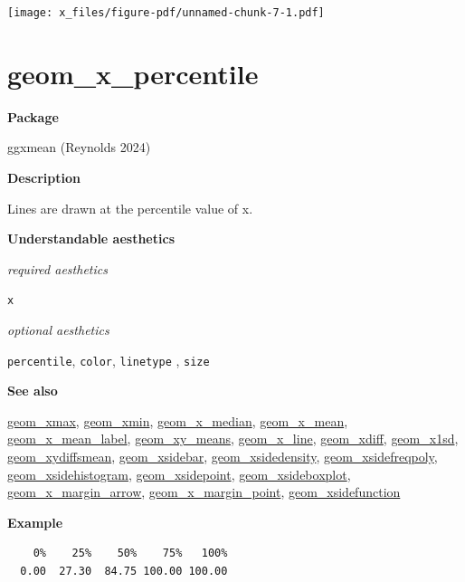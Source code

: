 \documentclass[
  letterpaper,
  DIV=11,
  numbers=noendperiod]{scrreprt}
\newenvironment{Shaded}{\begin{snugshade}}{\end{snugshade}}
\newcommand{\AttributeTok}[1]{\textcolor[rgb]{0.40,0.45,0.13}{#1}}
\newcommand{\FunctionTok}[1]{\textcolor[rgb]{0.28,0.35,0.67}{#1}}
\newcommand{\NormalTok}[1]{\textcolor[rgb]{0.00,0.23,0.31}{#1}}
\newcommand{\SpecialCharTok}[1]{\textcolor[rgb]{0.37,0.37,0.37}{#1}}
\begin{document}
\texttt{[image: x\_files/figure-pdf/unnamed-chunk-7-1.pdf]}

\section{geom\_x\_percentile}\label{x_percentile}

\textbf{Package}

ggxmean (Reynolds 2024)

\textbf{Description}

Lines are drawn at the percentile value of x.

\textbf{Understandable aesthetics}

\emph{required aesthetics}

\texttt{x}

\emph{optional aesthetics}

\texttt{percentile}, \texttt{color}, \texttt{linetype} , \texttt{size}

\textbf{See also}

\href{@xmax}{geom\_xmax}, \href{@xmin}{geom\_xmin},
\href{@x_median}{geom\_x\_median}, \href{@x_mean}{geom\_x\_mean},
\href{@x_mean_label}{geom\_x\_mean\_label},
\href{@xy_means}{geom\_xy\_means}, \href{@x_line}{geom\_x\_line},
\href{@xdiff}{geom\_xdiff}, \href{@x1sd}{geom\_x1sd},
\href{@xydiffsmean}{geom\_xydiffsmean},
\href{@xsidebar}{geom\_xsidebar},
\href{@xsidedensity}{geom\_xsidedensity},
\href{@xsidefreqpoly}{geom\_xsidefreqpoly},
\href{@xsidehistogram}{geom\_xsidehistogram},
\href{@xsidepoint}{geom\_xsidepoint},
\href{@xsideboxplot}{geom\_xsideboxplot},
\href{@x_margin_arrow}{geom\_x\_margin\_arrow},
\href{@x_margin_point}{geom\_x\_margin\_point},
\href{@xsidefunction}{geom\_xsidefunction}

\textbf{Example}

\begin{Shaded}
\end{Shaded}

\begin{verbatim}
    0%    25%    50%    75%   100% 
  0.00  27.30  84.75 100.00 100.00 
\end{verbatim}
\end{document}
